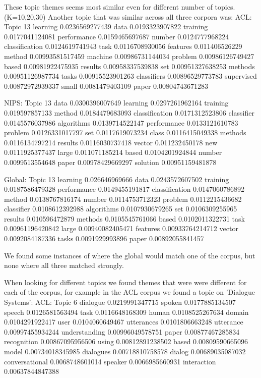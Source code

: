 \documentclass{article}
\begin{document}
These topic themes seems most similar even for different number of topics. (K=10,20,30)
Another topic that was similar across all three corpora was:
ACL:
Topic 13
learning 0.0236569277439
data 0.0193323907822
training 0.0177041124081
performance 0.0159465697687
number 0.0124777968224
classification 0.0124619741943
task 0.0116708930056
features 0.011406526229
method 0.00993581517459
machine 0.00986731144034
problem 0.00986126749427
based 0.00981922475935
results 0.00958337539838
set 0.00951327638253
methods 0.00951126987734
tasks 0.00915523901263
classifiers 0.00896529773783
supervised 0.00872972939337
small 0.0081479403109
paper 0.00804743671283

NIPS:
Topic 13
data 0.0300396007649
learning 0.0297261962164
training 0.019597857133
method 0.0184479683093
classification 0.0171312523806
classifier 0.0145576037986
algorithms 0.0139714522147
performance 0.0133121610783
problem 0.0126331017797
set 0.0117619073234
class 0.0116415049338
methods 0.0116134797214
results 0.0116030737418
vector 0.011232450178
new 0.0111925377437
large 0.011071185214
based 0.0104201924844
number 0.0099513554648
paper 0.00978429669297
solution 0.00951159481878

Global:
Topic 13
learning 0.026646969666
data 0.0243572607502
training 0.0187586479328
performance 0.0149455191817
classification 0.0147060786892
method 0.0138767816174
number 0.0114753712323
problem 0.0112215436682
classifier 0.0108612392988
algorithms 0.0107930679265
set 0.0106309255965
results 0.010596472879
methods 0.0105545761066
based 0.0102011322731
task 0.00961196420842
large 0.00940082405471
features 0.00933764214712
vector 0.0092084187336
tasks 0.0091929993896
paper 0.00892055841457

We found some instances of where the global would match one of the corpus, but none where all three matched strongly.

When looking for different topics we found themes that were were different for each of the corpus, for example in the ACL corpus we found a topic on 'Dialogue Systems':
ACL:
Topic 6
dialogue 0.0219991347715
spoken 0.0177885134507
speech 0.0126581563494
task 0.0116648168309
human 0.0108525267634
domain 0.0104291922417
user 0.0104060649467
utterances 0.0101806663248
utterance 0.00997455934244
understanding 0.00996049578751
paper 0.00877467285834
recognition 0.00867095956506
using 0.00812891238502
based 0.00809590665096
model 0.00734018345985
dialogues 0.00718810758578
dialog 0.00689035087032
conversational 0.0068748601014
speaker 0.0066985660931
interaction 0.00637844847388
\end{document}
